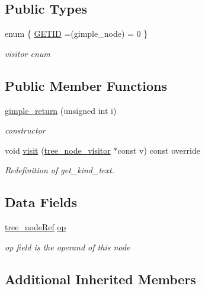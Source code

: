 \subsection*{Public Types}
\begin{DoxyCompactItemize}
\item 
enum \{ \hyperlink{structgimple__return_afa2374f352ee30f8ac459161216d9ac0a8b3a16ecbc400fbac4508dd35079f99e}{G\+E\+T\+ID} =(gimple\+\_\+node) = 0
 \}\begin{DoxyCompactList}\small\item\em visitor enum \end{DoxyCompactList}
\end{DoxyCompactItemize}
\subsection*{Public Member Functions}
\begin{DoxyCompactItemize}
\item 
\hyperlink{structgimple__return_ad57a88bad1857c649e1a559f42433b05}{gimple\+\_\+return} (unsigned int i)
\begin{DoxyCompactList}\small\item\em constructor \end{DoxyCompactList}\item 
void \hyperlink{structgimple__return_a96de93cec9dfd2df931c05bfe673f532}{visit} (\hyperlink{classtree__node__visitor}{tree\+\_\+node\+\_\+visitor} $\ast$const v) const override
\begin{DoxyCompactList}\small\item\em Redefinition of get\+\_\+kind\+\_\+text. \end{DoxyCompactList}\end{DoxyCompactItemize}
\subsection*{Data Fields}
\begin{DoxyCompactItemize}
\item 
\hyperlink{tree__node_8hpp_a6ee377554d1c4871ad66a337eaa67fd5}{tree\+\_\+node\+Ref} \hyperlink{structgimple__return_a48da47c569b1b859420fb0fecd9d7d0d}{op}
\begin{DoxyCompactList}\small\item\em op field is the operand of this node \end{DoxyCompactList}\end{DoxyCompactItemize}
\subsection*{Additional Inherited Members}


